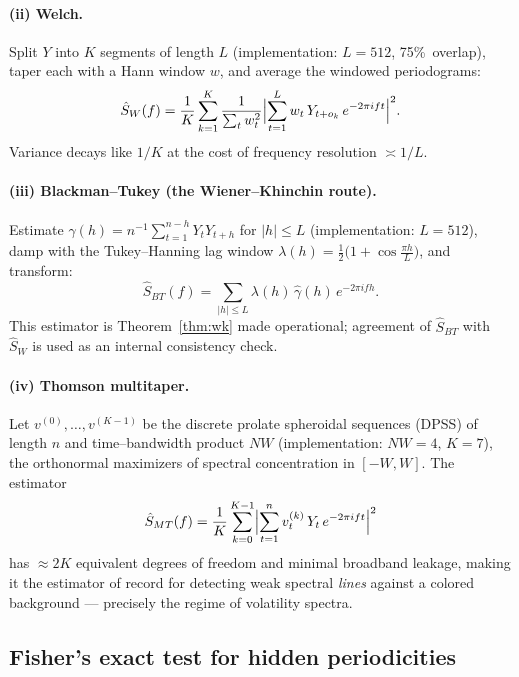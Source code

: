 \documentclass[11pt,a4paper]{article}
\begin{document}
\paragraph{(ii) Welch.} Split $Y$ into $K$ segments of length $L$ (implementation:
$L=512$, 75\%\ overlap), taper each with a Hann window $w$, and average the
windowed periodograms:
\begin{equation}
\hat S_W(f) = \frac{1}{K}\sum_{k=1}^{K} \frac{1}{\sum_t w_t^2}
\Bigl|\sum_{t=1}^{L} w_t\, Y_{t+o_k}\, e^{-2\pi i f t}\Bigr|^2 .
\end{equation}
Variance decays like $1/K$ at the cost of frequency resolution $\asymp 1/L$.

\paragraph{(iii) Blackman--Tukey (the Wiener--Khinchin route).} Estimate
$\hat\gamma(h)=n^{-1}\sum_{t=1}^{n-h} Y_t Y_{t+h}$ for $|h|\le L$ (implementation:
$L=512$), damp with the Tukey--Hanning lag window
$\lambda(h)=\tfrac12\bigl(1+\cos\tfrac{\pi h}{L}\bigr)$, and transform:
\begin{equation}
\hat S_{BT}(f) = \sum_{|h|\le L} \lambda(h)\,\hat\gamma(h)\, e^{-2\pi i f h}.
\end{equation}
This estimator is Theorem~\ref{thm:wk} made operational; agreement of
$\hat S_{BT}$ with $\hat S_W$ is used as an internal consistency check.

\paragraph{(iv) Thomson multitaper.} Let $v^{(0)},\dots,v^{(K-1)}$ be the discrete
prolate spheroidal sequences (DPSS) of length $n$ and time--bandwidth product
$NW$ (implementation: $NW=4$, $K=7$), the orthonormal maximizers of spectral
concentration in $[-W,W]$. The estimator
\begin{equation}
\hat S_{MT}(f) = \frac{1}{K}\sum_{k=0}^{K-1}
\Bigl| \sum_{t=1}^{n} v^{(k)}_t\, Y_t\, e^{-2\pi i f t} \Bigr|^2
\end{equation}
has $\approx 2K$ equivalent degrees of freedom and minimal broadband leakage,
making it the estimator of record for detecting weak spectral \emph{lines}
against a colored background --- precisely the regime of volatility spectra.

\subsection{Fisher's exact test for hidden periodicities}\label{sec:fisher}
\end{document}
